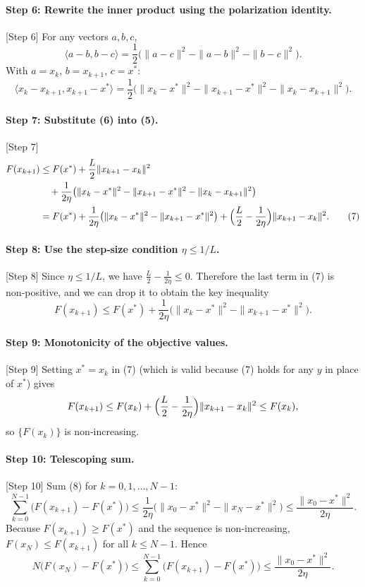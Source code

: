 \documentclass{article}
\begin{document}
\paragraph{Step 6: Rewrite the inner product using the polarization identity.} [Step 6]
For any vectors $a,b,c$,
\[
\langle a-b, b-c \rangle = \frac{1}{2}\bigl( \|a-c\|^2 - \|a-b\|^2 - \|b-c\|^2 \bigr).
\]
With $a = x_k$, $b = x_{k+1}$, $c = x^*$:
\[
\langle x_k - x_{k+1}, x_{k+1} - x^* \rangle = \frac{1}{2}\bigl( \|x_k - x^*\|^2 - \|x_{k+1} - x^*\|^2 - \|x_k - x_{k+1}\|^2 \bigr). \tag{6}
\]

\paragraph{Step 7: Substitute (6) into (5).} [Step 7]
\begin{align*}
F(x_{k+1}) &\le F(x^*) + \frac{L}{2}\|x_{k+1} - x_k\|^2 \\
&\quad + \frac{1}{2\eta}\bigl( \|x_k - x^*\|^2 - \|x_{k+1} - x^*\|^2 - \|x_k - x_{k+1}\|^2 \bigr) \\
&= F(x^*) + \frac{1}{2\eta}\bigl( \|x_k - x^*\|^2 - \|x_{k+1} - x^*\|^2 \bigr) + \Bigl(\frac{L}{2} - \frac{1}{2\eta}\Bigr)\|x_{k+1} - x_k\|^2. \tag{7}
\end{align*}

\paragraph{Step 8: Use the step‑size condition $\eta \le 1/L$.} [Step 8]
Since $\eta \le 1/L$, we have $\frac{L}{2} - \frac{1}{2\eta} \le 0$. Therefore the last term in (7) is non‑positive, and we can drop it to obtain the key inequality
\[
F(x_{k+1}) \le F(x^*) + \frac{1}{2\eta}\bigl( \|x_k - x^*\|^2 - \|x_{k+1} - x^*\|^2 \bigr). \tag{8}
\]

\paragraph{Step 9: Monotonicity of the objective values.} [Step 9]
Setting $x^* = x_k$ in (7) (which is valid because (7) holds for any $y$ in place of $x^*$) gives
\[
F(x_{k+1}) \le F(x_k) + \Bigl(\frac{L}{2} - \frac{1}{2\eta}\Bigr)\|x_{k+1} - x_k\|^2 \le F(x_k),
\]
so $\{F(x_k)\}$ is non‑increasing.

\paragraph{Step 10: Telescoping sum.} [Step 10]
Sum (8) for $k = 0,1,\dots,N-1$:
\[
\sum_{k=0}^{N-1} \bigl( F(x_{k+1}) - F(x^*) \bigr) \le \frac{1}{2\eta}\bigl( \|x_0 - x^*\|^2 - \|x_N - x^*\|^2 \bigr) \le \frac{\|x_0 - x^*\|^2}{2\eta}.
\]
Because $F(x_{k+1}) \ge F(x^*)$ and the sequence is non‑increasing, $F(x_N) \le F(x_{k+1})$ for all $k \le N-1$. Hence
\[
N \bigl( F(x_N) - F(x^*) \bigr) \le \sum_{k=0}^{N-1} \bigl( F(x_{k+1}) - F(x^*) \bigr) \le \frac{\|x_0 - x^*\|^2}{2\eta}.
\]
\end{document}
